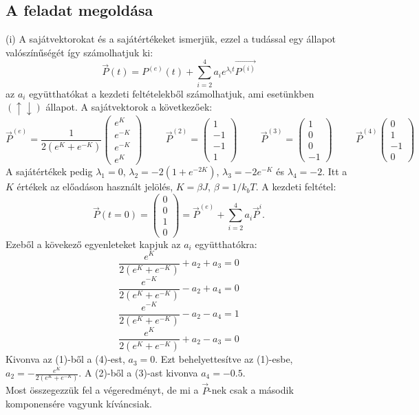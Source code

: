 \documentclass[12pt]{article}
\begin{document}
\subsection*{A feladat megoldása}
(i) A sajátvektorokat és a sajátértékeket ismerjük, ezzel a tudással egy állapot valószínűségét így számolhatjuk ki:
$$\vec{P}(t) = P^{(e)}(t)+\sum^4_{i = 2}a_ie^{\lambda_it}\vec{P^{(i)}}$$
az $a_i$ együtthatókat a kezdeti feltételekből számolhatjuk, ami esetünkben $(\uparrow\downarrow)$ állapot. A sajátvektorok a következőek:
\[
\vec{P}^{(e)} = \frac{1}{2(e^{K}+e^{-K})}
\begin{pmatrix}
	e^{K}\\
	e^{-K}\\
	e^{-K}\\
	e^{K}
\end{pmatrix}
\hspace{1cm}
\vec{P}^{(2)}=
  \begin{pmatrix}
	1\\
	-1\\
	-1\\
	1
\end{pmatrix}
\hspace{1cm}
\vec{P}^{(3)} =
\begin{pmatrix}
	1\\
	0\\
	0\\
	-1
\end{pmatrix}
\hspace{1cm}
\vec{P}^{(4)}
\begin{pmatrix}
	0\\
	1\\
	-1\\
	0
\end{pmatrix}
\]
A sajátértékek pedig $\lambda_1 = 0$, $\lambda_2 = -2(1 + e^{-2K})$, $\lambda_3 = -2e^{-K}$ és $\lambda_4 = -2$. Itt a $K$ értékek az előadáson használt jelölés, $K = \beta J$, $\beta = 1/k_bT$.
A kezdeti feltétel:
\[
\vec{P}(t = 0) = 
\begin{pmatrix}
	0\\
	0\\
	1\\
	0
\end{pmatrix}
= \vec{P}^{(e)} + \sum^{4}_{i = 2}a_i\vec{P}^{i}.
\]
Ezeből a kövekező egyenleteket kapjuk az $a_i$ együtthatókra:
\begin{equation}
\frac{e^K}{2(e^K+e^{-K})}+a_2+a_3 = 0
\end{equation}
\begin{equation}
\frac{e^{-K}}{2(e^K+e^{-K})}-a_2+a_4 = 0
\end{equation}
\begin{equation}
\frac{e^{-K}}{2(e^K+e^{-K})}-a_2-a_4 = 1
\end{equation}
\begin{equation}
\frac{e^K}{2(e^K+e^{-K})}+a_2-a_3 = 0
\end{equation}
Kivonva az (1)-ből a (4)-est, $a_3 = 0$. Ezt behelyettesítve az (1)-esbe, $a_2 = -\frac{e^K}{2(e^K+e^{-K})}$. A (2)-ből a (3)-ast kivonva $ a_4 = -0.5$.\\
Most összegezzük fel a végeredményt, de mi a $\vec{P}$-nek csak a második komponensére vagyunk kíváncsiak.
\end{document}
